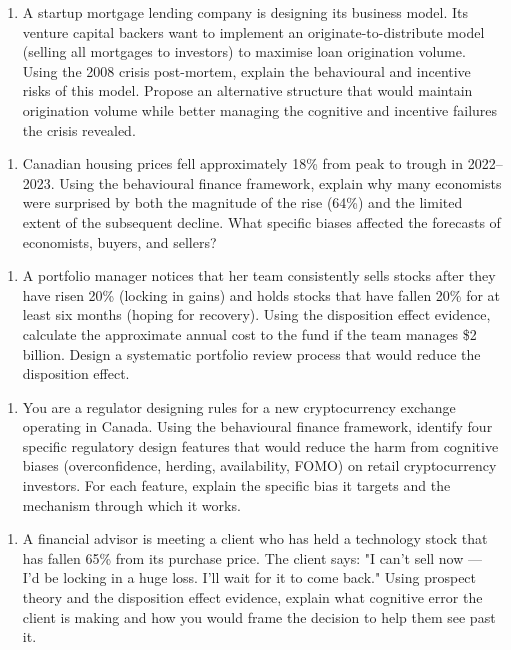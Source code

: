 \documentclass[12pt, letterpaper]{article}
\begin{document}
\begin{enumerate}
\item A startup mortgage lending company is designing its business model. Its venture capital backers want to implement an originate-to-distribute model (selling all mortgages to investors) to maximise loan origination volume. Using the 2008 crisis post-mortem, explain the behavioural and incentive risks of this model. Propose an alternative structure that would maintain origination volume while better managing the cognitive and incentive failures the crisis revealed.
\end{enumerate}

\begin{enumerate}
\item Canadian housing prices fell approximately 18\% from peak to trough in 2022--2023. Using the behavioural finance framework, explain why many economists were surprised by both the magnitude of the rise (64\%) and the limited extent of the subsequent decline. What specific biases affected the forecasts of economists, buyers, and sellers?
\end{enumerate}

\begin{enumerate}
\item A portfolio manager notices that her team consistently sells stocks after they have risen 20\% (locking in gains) and holds stocks that have fallen 20\% for at least six months (hoping for recovery). Using the disposition effect evidence, calculate the approximate annual cost to the fund if the team manages \$2 billion. Design a systematic portfolio review process that would reduce the disposition effect.
\end{enumerate}

\begin{enumerate}
\item You are a regulator designing rules for a new cryptocurrency exchange operating in Canada. Using the behavioural finance framework, identify four specific regulatory design features that would reduce the harm from cognitive biases (overconfidence, herding, availability, FOMO) on retail cryptocurrency investors. For each feature, explain the specific bias it targets and the mechanism through which it works.
\end{enumerate}

\begin{enumerate}
\item A financial advisor is meeting a client who has held a technology stock that has fallen 65\% from its purchase price. The client says: "I can't sell now --- I'd be locking in a huge loss. I'll wait for it to come back." Using prospect theory and the disposition effect evidence, explain what cognitive error the client is making and how you would frame the decision to help them see past it.
\end{enumerate}
\end{document}
